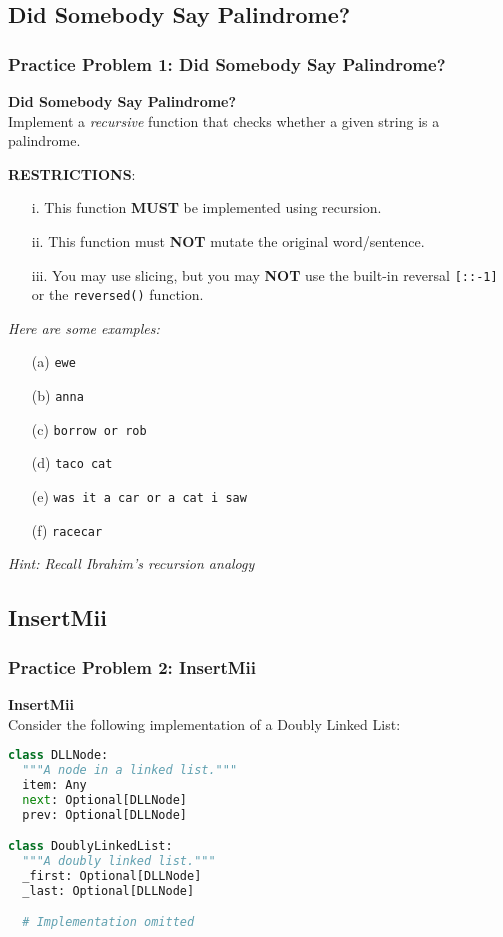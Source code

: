 \documentclass[hyperref={colorlinks,citecolor=blue,linkcolor=blue,urlcolor=blue}, aspectratio=1610]{beamer}
\begin{document}
\subsection{Did Somebody Say Palindrome?}
\begin{frame}[fragile]
  \frametitle{Practice Problem 1: Did Somebody Say Palindrome?}
  \textbf{Did Somebody Say Palindrome?}\\
  Implement a \textit{recursive} function that checks whether a given string is a palindrome.
  
  \begin{center}
    \textbf{RESTRICTIONS}:
    \begin{itemize}
      \item[i.] This function \textbf{MUST} be implemented using recursion.
      \item[ii.] This function must \textbf{NOT} mutate the original word/sentence.
      \item[iii.] You may use slicing, but you may \textbf{NOT} use the built-in reversal \texttt{[::-1]} or the \texttt{reversed()} function.
    \end{itemize}
  \end{center}

\textit{  Here are some examples:}
  \begin{enumerate}
      \item[(a)] \texttt{ewe}
      \item[(b)] \texttt{anna}
      \item[(c)] \texttt{borrow or rob}
      \item[(d)] \texttt{taco cat}
      \item[(e)] \texttt{was it a car or a cat i saw}
      \item[(f)] \texttt{racecar}
    \end{enumerate}
    \textit{Hint: Recall Ibrahim's recursion analogy}
\end{frame}

\subsection{InsertMii}
\begin{frame}[fragile]
  \frametitle{Practice Problem 2: InsertMii}
  \textbf{InsertMii}\\
  Consider the following implementation of a Doubly Linked List:

  \begin{lstlisting}[language=Python, style=mystyle]
class DLLNode:
  """A node in a linked list."""
  item: Any
  next: Optional[DLLNode]
  prev: Optional[DLLNode]

class DoublyLinkedList:
  """A doubly linked list."""
  _first: Optional[DLLNode]
  _last: Optional[DLLNode]

  # Implementation omitted
  \end{lstlisting}

\end{frame}
\end{document}
